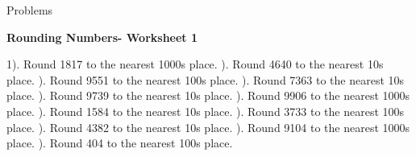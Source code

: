 \documentclass{article}%
\begin{document}
%
\huge%
\vspace*{\fill}%
\begin{center}%
Problems%
\end{center}%
\vspace*{\fill}%
\pagebreak%
\normalsize%
\large%
\begin{center}%
\textbf{Rounding Numbers- Worksheet 1}%
\newline%
\end{center} \normalsize%
1). Round 1817 to the nearest 1000s place.%
\newline%
\newline%
). Round 4640 to the nearest 10s place.%
\newline%
\newline%
). Round 9551 to the nearest 100s place.%
\newline%
\newline%
). Round 7363 to the nearest 10s place.%
\newline%
\newline%
). Round 9739 to the nearest 10s place.%
\newline%
\newline%
). Round 9906 to the nearest 1000s place.%
\newline%
\newline%
). Round 1584 to the nearest 10s place.%
\newline%
\newline%
). Round 3733 to the nearest 100s place.%
\newline%
\newline%
). Round 4382 to the nearest 10s place.%
\newline%
\newline%
). Round 9104 to the nearest 1000s place.%
\newline%
\newline%
). Round 404 to the nearest 100s place.%
\newline%
\newline%
\newline%
\end{document}
